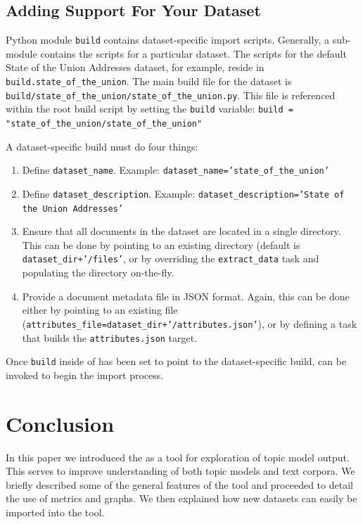 \documentclass[11pt]{article}
\begin{document}
\subsection{Adding Support For Your Dataset}
Python module \texttt{build} contains dataset-specific import scripts.
Generally, a sub-module contains the scripts for a particular dataset. The
scripts for the default State of the Union Addresses dataset, for example,
reside in \texttt{build.state\_\allowbreak{}of\_\allowbreak{}the\_\allowbreak{}union}. The main build file for the dataset
is \texttt{build/\allowbreak{}state\_\allowbreak{}of\_\allowbreak{}the\_\allowbreak{}union/\allowbreak{}state\_\allowbreak{}of\_\allowbreak{}the\_\allowbreak{}union.py}. This file is
referenced within the root \texttt{\buildscript} build script by setting the
\texttt{build} variable:
\texttt{build = "state\_\allowbreak{}of\_\allowbreak{}the\_\allowbreak{}union/\allowbreak{}state\_\allowbreak{}of\_\allowbreak{}the\_\allowbreak{}union"}

A dataset-specific build must do four things:
\begin{enumerate}
\item Define \texttt{dataset\_name}.
    \newline Example: \texttt{dataset\_name='state\_of\_the\_union'}
  \item Define \texttt{dataset\_description}.
    \newline Example: \texttt{dataset\_description='State of the Union Addresses'}
  \item Ensure that all documents in the dataset are located in a single directory.
    This can be done by pointing to an existing directory (default is \texttt{dataset\_dir+'/files'}, or by overriding the
    \texttt{extract\_data} task and populating the directory on-the-fly.
  \item Provide a document metadata file in JSON format. Again, this can be done
    either by pointing to an existing file (\texttt{attributes\_\allowbreak{}file=\allowbreak{}dataset\_\allowbreak{}dir\allowbreak{}+\allowbreak{}'/attributes\allowbreak{}.json'}), or by defining a task that builds the \texttt{attributes.json} target.
\end{enumerate}

Once \texttt{build} inside of \texttt{\buildscript} has been set to point to
the dataset-specific build, \texttt{\buildscript} can be invoked to begin the
import process.

\section{Conclusion}
In this paper we introduced the \tool{} as a tool for exploration of
topic model output. This serves to improve understanding of both topic models
and text corpora. We briefly described some of the general features of the tool
and proceeded to detail the use of metrics and graphs. We then explained how
new datasets can easily be imported into the tool.
\end{document}
